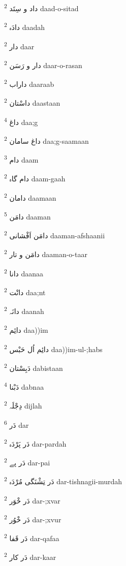 \documentclass[12pt]{article}
\begin{document}
\begin{multicols}{5}
{\ur داد و سِتَد}   \textsuperscript{2} daad-o-sitad

{\ur دادَہ}   \textsuperscript{2} daadah

{\ur دار}   \textsuperscript{2} daar

{\ur دار و رَسَن}   \textsuperscript{2} daar-o-rasan

{\ur داراب}   \textsuperscript{2} daaraab

{\ur داسْتان}   \textsuperscript{2} daastaan

{\ur داغ}   \textsuperscript{4} daa;g

{\ur داغ سامان}   \textsuperscript{2} daa;g-saamaan

{\ur دام}   \textsuperscript{3} daam

{\ur دام گاہ}   \textsuperscript{2} daam-gaah

{\ur دامان}   \textsuperscript{2} daamaan

{\ur دامَن}   \textsuperscript{5} daaman

{\ur دامَن اَفْشانی}   \textsuperscript{2} daaman-afshaanii

{\ur دامَن و تار}   \textsuperscript{2} daaman-o-taar

{\ur دانا}   \textsuperscript{2} daanaa

{\ur دانْت}   \textsuperscript{2} daa;nt

{\ur دانَہ}   \textsuperscript{2} daanah

{\ur دائِم}   \textsuperscript{2} daa))im

{\ur دائِم اُل حَبْس}   \textsuperscript{2} daa))im-ul-;habs

{\ur دَبِسْتان}   \textsuperscript{2} dabistaan

{\ur دَبْنا}   \textsuperscript{4} dabnaa

{\ur دِجْلَہ}   \textsuperscript{2} dijlah

{\ur دَر}   \textsuperscript{6} dar

{\ur دَر پَرْدَہ}   \textsuperscript{2} dar-pardah

{\ur دَر پے}   \textsuperscript{2} dar-pai

{\ur دَر تِشْنَگی مُرْدَہ}   \textsuperscript{2} dar-tishnagii-murdah

{\ur دَر خْوَر}   \textsuperscript{2} dar-;xvar

{\ur دَر خْوُر}   \textsuperscript{2} dar-;xvur

{\ur دَر قَفا}   \textsuperscript{2} dar-qafaa

{\ur دَر کار}   \textsuperscript{2} dar-kaar


\end{multicols}
\end{document}
